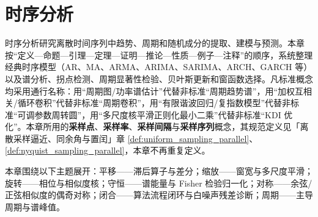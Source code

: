 \chapter{时序分析}
\label{chap:ts_analysis}

\begin{remark}[本章定位]\label{rem:ts_chapter_positioning}
时序分析研究离散时间序列中趋势、周期和随机成分的提取、建模与预测。本章按“定义—命题—引理—定理—证明—推论—性质—例子—注释”的顺序，系统整理经典时序模型（AR、MA、ARMA、ARIMA、SARIMA、ARCH、GARCH 等）以及谱分析、拐点检测、周期显著性检验、贝叶斯更新和窗函数选择。凡标准概念均采用通行名称：用“周期图/功率谱估计”代替非标准“周期趋势谱”，用“加权互相关/循环卷积”代替非标准“周期卷积”，用“有限谐波回归/复指数模型”代替非标准“可调参数周转圆”，用“多尺度核平滑正则化最小二乘”代替非标准“KDI 优化”。本章所用的\textbf{采样点}、\textbf{采样率}、\textbf{采样间隔}与\textbf{采样序列}概念，其规范定义见「离散采样逼近、同余角与置闰」章 \cref{def:uniform_sampling_parallel}、\cref{def:nyquist_sampling_parallel}，本章不再重复定义。
\end{remark}

\begin{remark}[本章主题概览]\label{rem:ts_theme_overview}
本章围绕以下主题展开：平移——滞后算子与差分；缩放——窗宽与多尺度平滑；旋转——相位与相似度核；守恒——谱能量与 Fisher 检验归一化；对称——余弦/正弦相似度的偶奇对称；闭合——算法流程闭环与白噪声残差诊断；周期——主导周期与谱峰值。
\end{remark}

